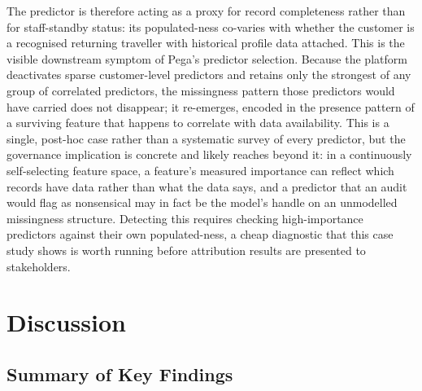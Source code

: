 \documentclass[oneside]{memoir} %
\begin{document}


The predictor is therefore acting as a proxy for record completeness rather than for staff-standby status: its populated-ness co-varies with whether the customer is a recognised returning traveller with historical profile data attached. This is the visible downstream symptom of Pega's predictor selection. Because the platform deactivates sparse customer-level predictors and retains only the strongest of any group of correlated predictors, the missingness pattern those predictors would have carried does not disappear; it re-emerges, encoded in the presence pattern of a surviving feature that happens to correlate with data availability. This is a single, post-hoc case rather than a systematic survey of every predictor, but the governance implication is concrete and likely reaches beyond it: in a continuously self-selecting feature space, a feature's measured importance can reflect which records have data rather than what the data says, and a predictor that an audit would flag as nonsensical may in fact be the model's handle on an unmodelled missingness structure. Detecting this requires checking high-importance predictors against their own populated-ness, a cheap diagnostic that this case study shows is worth running before attribution results are presented to stakeholders.

\chapter{Discussion} \label{Discussion}

\section{Summary of Key Findings}
\end{document}
